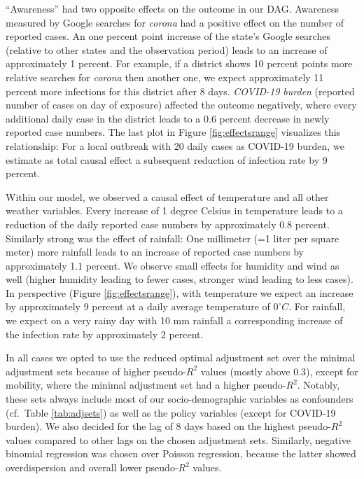 \documentclass[]{elsarticle} %
\begin{document}
``Awareness'' had two opposite effects on the outcome in our DAG.
Awareness measured by Google searches for \emph{corona} had a positive
effect on the number of reported cases. An one percent point increase of
the state's Google searches (relative to other states and the
observation period) leads to an increase of approximately 1 percent. For
example, if a district shows 10 percent points more relative searches
for \emph{corona} then another one, we expect approximately 11 percent
more infections for this district after 8 days. \emph{COVID-19 burden}
(reported number of cases on day of exposure) affected the outcome
negatively, where every additional daily case in the district leads to a
0.6 percent decrease in newly reported case numbers. The last plot in
Figure \ref{fig:effectsrange} visualizes this relationship: For a local
outbreak with 20 daily cases as COVID-19 burden, we estimate as total
causal effect a subsequent reduction of infection rate by 9 percent.

Within our model, we observed a causal effect of temperature and all
other weather variables. Every increase of 1 degree Celsius in
temperature leads to a reduction of the daily reported case numbers by
approximately 0.8 percent. Similarly strong was the effect of rainfall:
One millimeter (=1 liter per square meter) more rainfall leads to an
increase of reported case numbers by approximately 1.1 percent. We
observe small effects for humidity and wind as well (higher humidity
leading to fewer cases, stronger wind leading to less cases). In
perspective (Figure \ref{fig:effectsrange}), with temperature we expect
an increase by approximately 9 percent at a daily average temperature of
\(0^{\circ}C\). For rainfall, we expect on a very rainy day with 10 mm
rainfall a corresponding increase of the infection rate by approximately
2 percent.

In all cases we opted to use the reduced optimal adjustment set over the
minimal adjustment sets because of higher pseudo-\(R^2\) values (mostly
above 0.3), except for mobility, where the minimal adjustment set had a
higher pseudo-\(R^2\). Notably, these sets always include most of our
socio-demographic variables as confounders (cf.~Table \ref{tab:adjsets})
as well as the policy variables (except for COVID-19 burden). We also
decided for the lag of 8 days based on the highest pseudo-\(R^2\) values
compared to other lags on the chosen adjustment sets. Similarly,
negative binomial regression was chosen over Poisson regression, because
the latter showed overdispersion and overall lower pseudo-\(R^2\)
values.
\end{document}

